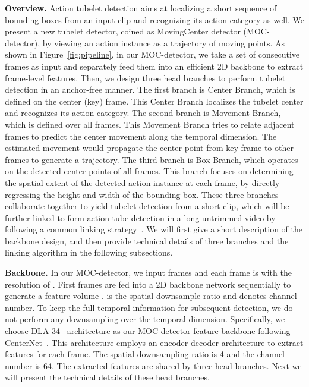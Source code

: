 \documentclass[runningheads]{llncs}
\begin{document}
{\bf Overview.} Action tubelet detection aims at localizing a short sequence of bounding boxes from an input clip and recognizing its action category as well. We present a new tubelet detector, coined as {MovingCenter detector} (MOC-detector), by viewing an action instance as a trajectory of moving points. As shown in Figure~\ref{fig:pipeline}, in our MOC-detector, we take a set of consecutive frames as input and separately feed them into an efficient 2D backbone to extract frame-level features. Then, we design three head branches to perform tubelet detection in an anchor-free manner. The first branch is Center Branch, which is defined on the center (key) frame. This Center Branch localizes the tubelet center and recognizes its action category. The second branch is Movement Branch, which is defined over all frames. This Movement Branch tries to relate adjacent frames to predict the center movement along the temporal dimension. The estimated movement would propagate the center point from key frame to other frames to generate a trajectory. The third branch is Box Branch, which operates on the detected center points of all frames. This branch focuses on determining the spatial extent of the detected action instance at each frame, by directly regressing the height and width of the bounding box. These three branches collaborate together to yield tubelet detection from a short clip, which will be further linked to form action tube detection in a long untrimmed video by following a common linking strategy~\cite{kalogeiton2017action}. We will first give a short description of the backbone design, and then provide technical details of three branches and the linking algorithm in the following subsections.

{\bf Backbone.} In our MOC-detector, we input  frames and each frame is with the resolution of .  First  frames are fed into a 2D backbone network sequentially to generate a feature volume .  is the spatial downsample ratio and  denotes channel number. To keep the full temporal information for subsequent detection, we do not perform any downsampling over the temporal dimension. Specifically, we choose DLA-34~\cite{DLA} architecture as our MOC-detector feature backbone following CenterNet~\cite{CenterNet}.
This architecture employs an encoder-decoder architecture to extract features for each frame. The spatial downsampling ratio  is 4 and the channel number  is 64. The extracted features are shared by three head branches.
Next we will present the technical details of these head branches.
\end{document}
